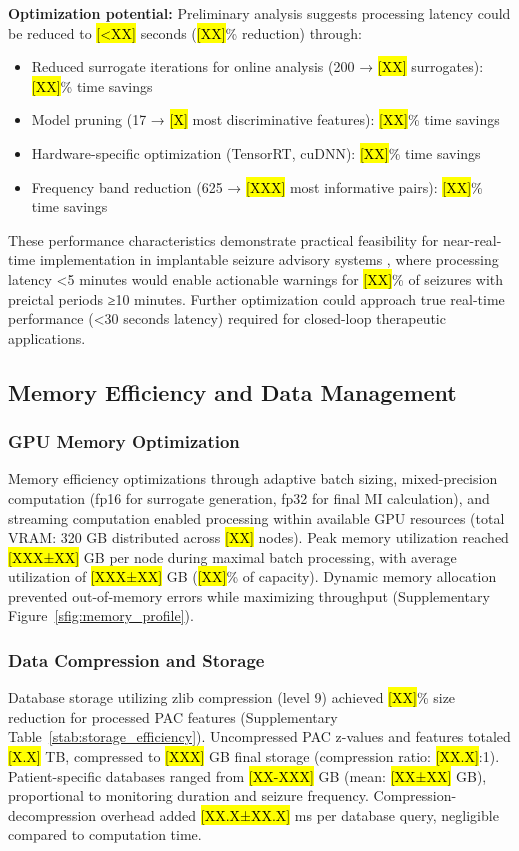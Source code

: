 \textbf{Optimization potential:} Preliminary analysis suggests processing latency could be reduced to \hl{[<XX]} seconds (\hl{[XX]}\% reduction) through:
\begin{itemize}
\item Reduced surrogate iterations for online analysis (200 → \hl{[XX]} surrogates): \hl{[XX]}\% time savings
\item Model pruning (17 → \hl{[X]} most discriminative features): \hl{[XX]}\% time savings
\item Hardware-specific optimization (TensorRT, cuDNN): \hl{[XX]}\% time savings
\item Frequency band reduction (625 → \hl{[XXX]} most informative pairs): \hl{[XX]}\% time savings
\end{itemize}

These performance characteristics demonstrate practical feasibility for near-real-time implementation in implantable seizure advisory systems \cite{Kuhlmann2018SeizurePA,Freestone2015SeizurePSBF}, where processing latency <5 minutes would enable actionable warnings for \hl{[XX]}\% of seizures with preictal periods ≥10 minutes. Further optimization could approach true real-time performance (<30 seconds latency) required for closed-loop therapeutic applications.

\subsection{Memory Efficiency and Data Management}
\subsubsection{GPU Memory Optimization}
Memory efficiency optimizations through adaptive batch sizing, mixed-precision computation (fp16 for surrogate generation, fp32 for final MI calculation), and streaming computation enabled processing within available GPU resources (total VRAM: 320 GB distributed across \hl{[XX]} nodes). Peak memory utilization reached \hl{[XXX±XX]} GB per node during maximal batch processing, with average utilization of \hl{[XXX±XX]} GB (\hl{[XX]}\% of capacity). Dynamic memory allocation prevented out-of-memory errors while maximizing throughput (Supplementary Figure~\ref{sfig:memory_profile}).

\subsubsection{Data Compression and Storage}
Database storage utilizing zlib compression (level 9) achieved \hl{[XX]}\% size reduction for processed PAC features (Supplementary Table~\ref{stab:storage_efficiency}). Uncompressed PAC z-values and features totaled \hl{[X.X]} TB, compressed to \hl{[XXX]} GB final storage (compression ratio: \hl{[XX.X]}:1). Patient-specific databases ranged from \hl{[XX-XXX]} GB (mean: \hl{[XX±XX]} GB), proportional to monitoring duration and seizure frequency. Compression-decompression overhead added \hl{[XX.X±XX.X]} ms per database query, negligible compared to computation time.

